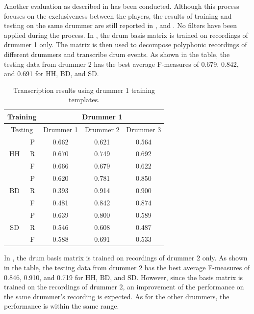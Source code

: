 \documentclass{article}
\begin{document}
Another evaluation as described in  has been conducted. Although this process focuses on the exclusiveness between the players, the results of training and testing on the same drummer are still reported in ,  and . No filters have been applied during the process. In , the drum basis matrix is trained on recordings of drummer 1 only. The matrix is then used to decompose polyphonic recordings of different drummers and transcribe drum events. As shown in the table, the testing data from drummer 2 has the best average F-measures of 0.679, 0.842, and 0.691 for HH, BD, and SD.   

\begin{table}[h]
\begin{center}
\begin{tabular}{|c|c|c|c|c|}
\hline
\multicolumn{2}{|c}{Training} & \multicolumn{3}{|c|}{Drummer 1}   \\ \hline
\multicolumn{2}{|c|}{Testing} & Drummer 1 & Drummer 2 & Drummer 3 \\ \hline
\multirow{3}{*}{HH}    & P    & 0.662     & 0.621     & 0.564     \\ \cline{2-5} 
                       & R    & 0.670     & 0.749     & 0.692     \\ \cline{2-5} 
                       & F    & 0.666     & 0.679     & 0.622     \\ \hline
\multirow{3}{*}{BD}    & P    & 0.620     & 0.781     & 0.850      \\ \cline{2-5} 
                       & R    & 0.393     & 0.914     & 0.900      \\ \cline{2-5} 
                       & F    & 0.481     & 0.842     & 0.874     \\ \hline
\multirow{3}{*}{SD}    & P    & 0.639     & 0.800     & 0.589     \\ \cline{2-5} 
                       & R    & 0.546     & 0.608     & 0.487     \\ \cline{2-5} 
                       & F    & 0.588     & 0.691     & 0.533     \\ \hline
\end{tabular}
 \caption{Transcription results using drummer 1 training templates.}
 \label{tab:trainDr1}
\end{center}
\end{table}

In , the drum basis matrix is trained on recordings of drummer 2 only. As shown in the table, the testing data from drummer 2 has the best average F-measures of 0.846, 0.910, and 0.719 for HH, BD, and SD. However, since the basis matrix is trained on the recordings of drummer 2, an improvement of the performance on the same drummer's recording is expected. As for the other drummers, the performance is within the same range.     
\end{document}
